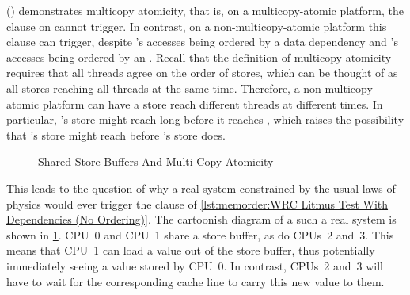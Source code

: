 \begin{fcvref}
()
demonstrates multicopy atomicity, that is, on a multicopy-atomic platform,
the  clause on  cannot trigger.
In contrast, on a non-multicopy-atomic
platform this  clause can trigger, despite
's accesses being ordered by a data dependency and 's
accesses being ordered by an .
Recall that the definition of multicopy atomicity requires that all
threads agree on the order of stores, which can be thought of as
all stores reaching all threads at the same time.
Therefore, a non-multicopy-atomic platform can have a store reach
different threads at different times.
In particular, 's store might reach  long before it
reaches , which raises the possibility that 's store
might reach  before 's store does.
\end{fcvref}

\begin{figure}
\centering
{}
\caption{Shared Store Buffers And Multi-Copy Atomicity}
\label{fig:memorder:Shared Store Buffers And Multi-Copy Atomicity}
\end{figure}

This leads to the question of why a real system constrained by the
usual laws of physics would ever trigger the  clause of
\cref{lst:memorder:WRC Litmus Test With Dependencies (No Ordering)}.
The cartoonish diagram of a such a real system is shown in
\cref{fig:memorder:Shared Store Buffers And Multi-Copy Atomicity}.
CPU~0 and CPU~1 share a store buffer, as do CPUs~2 and~3.
This means that CPU~1 can load a value out of the store buffer, thus
potentially immediately seeing a value stored by CPU~0.
In contrast, CPUs~2 and~3 will have to wait for the corresponding cache
line to carry this new value to them.

